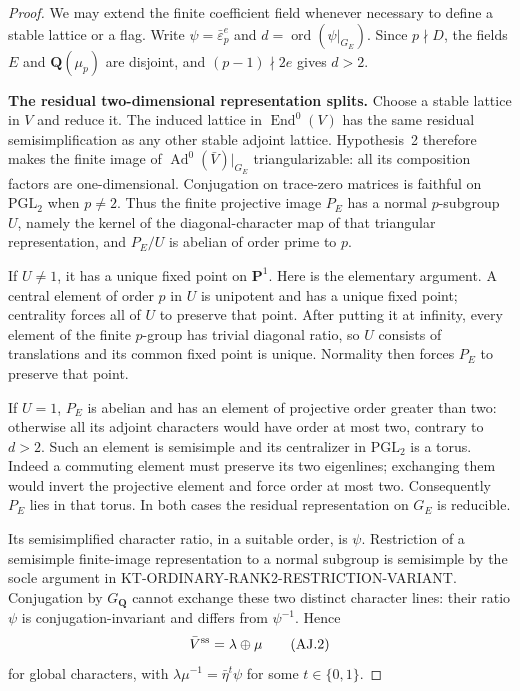 \documentclass[11pt,a4paper]{article}
\theoremstyle{definition}
\renewcommand{\paragraph}[1]{\par\smallskip\noindent\textbf{#1}\quad\ignorespaces}
\begin{document}
\begin{proof}
We may extend the finite coefficient field whenever
necessary to define a stable lattice or a flag.
Write $\psi=\bar\varepsilon_p^e$ and
$d=\operatorname{ord}(\psi|_{G_E})$.  Since
$p\nmid D$, the fields $E$ and $\mathbf Q(\mu_p)$
are disjoint, and $(p-1)\nmid2e$ gives $d>2$.

\paragraph{The residual two-dimensional representation splits.}
Choose a stable lattice in $V$ and reduce it.
The induced lattice in $\operatorname{End}^0(V)$
has the same residual semisimplification as any
other stable adjoint lattice.  Hypothesis~2
therefore makes the finite image of
$\operatorname{Ad}^0(\bar V)|_{G_E}$ triangularizable:
all its composition factors are one-dimensional.
Conjugation on trace-zero matrices is faithful
on $\mathrm{PGL}_2$ when $p\ne2$.
Thus the finite projective image $P_E$ has a
normal $p$-subgroup $U$, namely the kernel of
the diagonal-character map of that triangular
representation, and $P_E/U$ is abelian of
order prime to $p$.

If $U\ne1$, it has a unique fixed point on
$\mathbf P^1$.  Here is the elementary argument.
A central element of order $p$ in $U$ is
unipotent and has a unique fixed point; centrality
forces all of $U$ to preserve that point.
After putting it at infinity, every element of
the finite $p$-group has trivial diagonal ratio,
so $U$ consists of translations and its common
fixed point is unique.  Normality then forces
$P_E$ to preserve that point.

If $U=1$, $P_E$ is abelian and has an element
of projective order greater than two: otherwise
all its adjoint characters would have order at
most two, contrary to $d>2$.
Such an element is semisimple and its centralizer
in $\mathrm{PGL}_2$ is a torus.  Indeed a commuting
element must preserve its two eigenlines;
exchanging them would invert the projective
element and force order at most two.
Consequently $P_E$ lies in that torus.
In both cases the residual representation on
$G_E$ is reducible.

Its semisimplified character ratio, in a suitable
order, is $\psi$.  Restriction of a semisimple
finite-image representation to a normal subgroup
is semisimple by the socle argument in
KT-ORDINARY-RANK2-RESTRICTION-VARIANT.
Conjugation by $G_{\mathbf Q}$ cannot exchange
these two distinct character lines: their ratio
$\psi$ is conjugation-invariant and differs from
$\psi^{-1}$.  Hence
\[
                  \bar V^{\rm ss}=\lambda\oplus\mu
                                                               \tag{AJ.2}
\]
for global characters, with
$\lambda\mu^{-1}=\bar\eta^t\psi$ for some
$t\in\{0,1\}$.


\end{proof}
\end{document}
